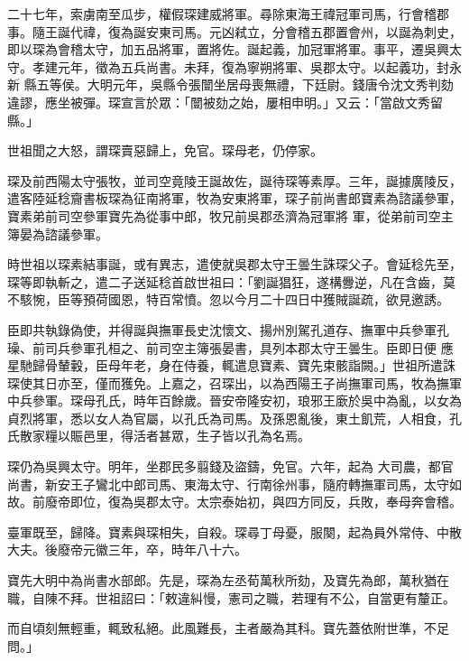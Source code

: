 \begin{pinyinscope}
 二十七年，索虜南至瓜步，權假琛建威將軍。尋除東海王禕冠軍司馬，行會稽郡事。隨王誕代禕，復為誕安東司馬。元凶弒立，分會稽五郡置會州，以誕為刺史，即以琛為會稽太守，加五品將軍，置將佐。誕起義，加冠軍將軍。事平，遷吳興太守。孝建元年，徵為五兵尚書。未拜，復為寧朔將軍、吳郡太守。以起義功，封永新
 縣五等侯。大明元年，吳縣令張闓坐居母喪無禮，下廷尉。錢唐令沈文秀判劾違謬，應坐被彈。琛宣言於眾：「闓被劾之始，屢相申明。」又云：「當啟文秀留縣。」



 世祖聞之大怒，謂琛賣惡歸上，免官。琛母老，仍停家。



 琛及前西陽太守張牧，並司空竟陵王誕故佐，誕待琛等素厚。三年，誕據廣陵反，遣客陸延稔齎書板琛為征南將軍，牧為安東將軍，琛子前尚書郎寶素為諮議參軍，寶素弟前司空參軍寶先為從事中郎，牧兄前吳郡丞濟為冠軍將
 軍，從弟前司空主簿晏為諮議參軍。



 時世祖以琛素結事誕，或有異志，遣使就吳郡太守王曇生誅琛父子。會延稔先至，琛等即執斬之，遣二子送延稔首啟世祖曰：「劉誕猖狂，遂構釁逆，凡在含齒，莫不駭惋，臣等預荷國恩，特百常憤。忽以今月二十四日中獲賊誕疏，欲見邀誘。



 臣即共執錄偽使，并得誕與撫軍長史沈懷文、揚州別駕孔道存、撫軍中兵參軍孔璪、前司兵參軍孔桓之、前司空主簿張晏書，具列本郡太守王曇生。臣即日便
 應星馳歸骨輦轂，臣母年老，身在侍養，輒遣息寶素、寶先束骸詣闕。」世祖所遣誅琛使其日亦至，僅而獲免。上嘉之，召琛出，以為西陽王子尚撫軍司馬，牧為撫軍中兵參軍。琛母孔氏，時年百餘歲。晉安帝隆安初，琅邪王廞於吳中為亂，以女為貞烈將軍，悉以女人為官屬，以孔氏為司馬。及孫恩亂後，東土飢荒，人相食，孔氏散家糧以賑邑里，得活者甚眾，生子皆以孔為名焉。



 琛仍為吳興太守。明年，坐郡民多翦錢及盜鑄，免官。六年，起為
 大司農，都官尚書，新安王子鸞北中郎司馬、東海太守、行南徐州事，隨府轉撫軍司馬，太守如故。前廢帝即位，復為吳郡太守。太宗泰始初，與四方同反，兵敗，奉母奔會稽。



 臺軍既至，歸降。寶素與琛相失，自殺。琛尋丁母憂，服闋，起為員外常侍、中散大夫。後廢帝元徽三年，卒，時年八十六。



 寶先大明中為尚書水部郎。先是，琛為左丞荀萬秋所劾，及寶先為郎，萬秋猶在職，自陳不拜。世祖詔曰：「敕違糾慢，憲司之職，若理有不公，自當更有釐正。



 而自頃刻無輕重，輒致私絕。此風難長，主者嚴為其科。寶先蓋依附世準，不足問。」




\end{pinyinscope}
